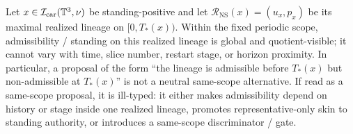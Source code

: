 \begin{manualtheorem}
\label{thm:no-admissibility-dynamics-realized-lineages}
Let $x\in\mathcal I_{\mathrm{car}}(\mathbb{T}^3,\nu)$ be standing-positive and let $\mathcal R_{\mathrm{NS}}(x)=(u_x,p_x)$ be its maximal realized lineage on $[0,T_*(x))$. Within the fixed periodic scope, admissibility / standing on this realized lineage is global and quotient-visible; it cannot vary with time, slice number, restart stage, or horizon proximity. In particular, a proposal of the form ``the lineage is admissible before $T_*(x)$ but non-admissible at $T_*(x)$'' is not a neutral same-scope alternative. If read as a same-scope proposal, it is ill-typed: it either makes admissibility depend on history or stage inside one realized lineage, promotes representative-only skin to standing authority, or introduces a same-scope discriminator / gate.
\end{manualtheorem}

